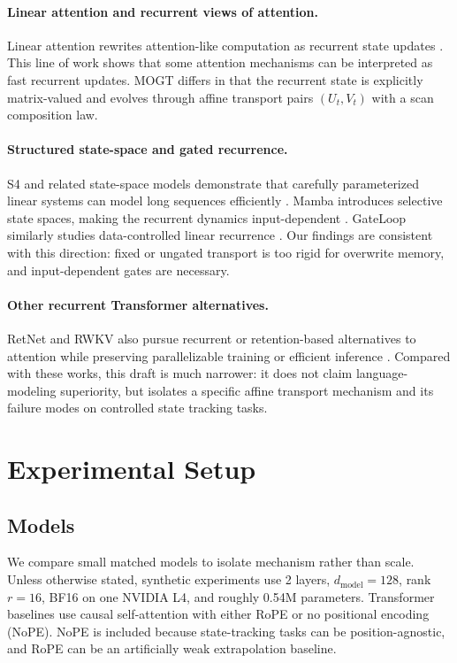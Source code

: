 \documentclass[10pt]{article}
\newcommand{\mogt}{MOGT}
\begin{document}
\paragraph{Linear attention and recurrent views of attention.}
Linear attention rewrites attention-like computation as recurrent state updates
\cite{katharopoulos2020transformers}. This line of work shows that some
attention mechanisms can be interpreted as fast recurrent updates. \mogt{}
differs in that the recurrent state is explicitly matrix-valued and evolves
through affine transport pairs $(U_t,V_t)$ with a scan composition law.

\paragraph{Structured state-space and gated recurrence.}
S4 and related state-space models demonstrate that carefully parameterized
linear systems can model long sequences efficiently \cite{gu2021s4}. Mamba
introduces selective state spaces, making the recurrent dynamics input-dependent
\cite{gu2023mamba}. GateLoop similarly studies data-controlled linear
recurrence \cite{koo2023gateloop}. Our findings are consistent with this
direction: fixed or ungated transport is too rigid for overwrite memory, and
input-dependent gates are necessary.

\paragraph{Other recurrent Transformer alternatives.}
RetNet and RWKV also pursue recurrent or retention-based alternatives to
attention while preserving parallelizable training or efficient inference
\cite{sun2023retnet,peng2023rwkv}. Compared with these works, this draft is
much narrower: it does not claim language-modeling superiority, but isolates a
specific affine transport mechanism and its failure modes on controlled state
tracking tasks.

\section{Experimental Setup}

\subsection{Models}

We compare small matched models to isolate mechanism rather than scale. Unless
otherwise stated, synthetic experiments use 2 layers, $d_{\mathrm{model}}=128$,
rank $r=16$, BF16 on one NVIDIA L4, and roughly 0.54M parameters. Transformer
baselines use causal self-attention with either RoPE or no positional encoding
(NoPE). NoPE is included because state-tracking tasks can be position-agnostic,
and RoPE can be an artificially weak extrapolation baseline.
\end{document}
